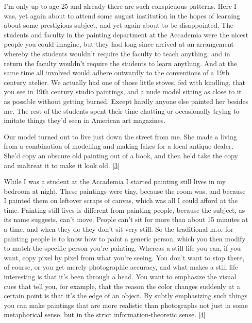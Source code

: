 I'm only up to age 25 and already there are such
                  conspicuous patterns. Here I was, yet again about to attend
                  some august institution in the hopes of learning about some
                  prestigious subject, and yet again about to be disappointed.
                  The students and faculty in the painting department at the
                  Accademia were the nicest people you could imagine, but they
                  had long since arrived at an arrangement whereby the students
                  wouldn't require the faculty to teach anything, and in return
                  the faculty wouldn't require the students to learn anything.
                  And at the same time all involved would adhere outwardly to
                  the conventions of a 19th century atelier. We actually had one
                  of those little stoves, fed with kindling, that you see in
                  19th century studio paintings, and a nude model sitting as
                  close to it as possible without getting burned. Except hardly
                  anyone else painted her besides me. The rest of the students
                  spent their time chatting or occasionally trying to imitate
                  things they'd seen in American art magazines.

Our
                  model turned out to live just down the street from me. She
                  made a living from a combination of modelling and making fakes
                  for a local antique dealer. She'd copy an obscure old painting
                  out of a book, and then he'd take the copy and maltreat it to
                  make it look old.
                  [\href{\#f3n}{3}]

While I was a student at the Accademia I started
                  painting still lives in my bedroom at night. These paintings
                  were tiny, because the room was, and because I painted them on
                  leftover scraps of canvas, which was all I could afford at the
                  time. Painting still lives is different from painting people,
                  because the subject, as its name suggests, can't move. People
                  can't sit for more than about 15 minutes at a time, and when
                  they do they don't sit very still. So the traditional m.o. for
                  painting people is to know how to paint a generic person,
                  which you then modify to match the specific person you're
                  painting. Whereas a still life you can, if you want, copy
                  pixel by pixel from what you're seeing. You don't want to stop
                  there, of course, or you get merely photographic accuracy, and
                  what makes a still life interesting is that it's been through
                  a head. You want to emphasize the visual cues that tell you,
                  for example, that the reason the color changes suddenly at a
                  certain point is that it's the edge of an object. By subtly
                  emphasizing such things you can make paintings that are more
                  realistic than photographs not just in some metaphorical
                  sense, but in the strict information-theoretic sense.
                  [\href{\#f4n}{4}]

